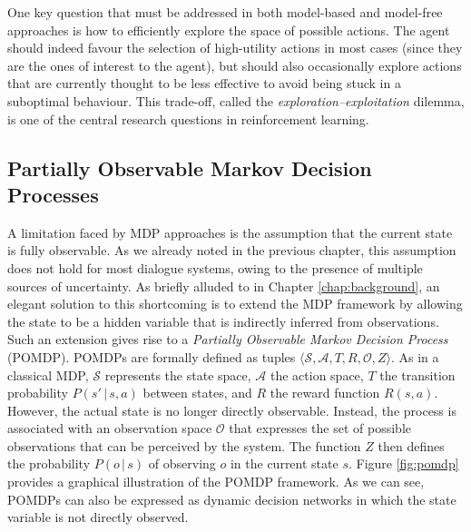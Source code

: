 One key question that must be addressed in both model-based and model-free approaches is how  to efficiently explore the space of possible actions.  The agent should indeed favour the selection of high-utility actions in most cases (since they are the ones of interest to the agent), but should also occasionally explore actions that are currently thought to be less effective to avoid being stuck in a suboptimal behaviour. This trade-off, called the \textit{exploration--exploitation} dilemma, is one of the central research questions in reinforcement learning. 


\subsection{Partially Observable Markov Decision Processes}
\label{sec:pomdp}

A limitation faced by MDP approaches is the assumption that the current state is fully observable. As we already noted in the previous chapter, this assumption does not hold for most dialogue systems, owing to the presence of multiple sources of uncertainty.  As briefly alluded to in Chapter \ref{chap:background}, an elegant solution to this shortcoming is to extend the MDP framework by allowing the state to be a hidden variable that is indirectly inferred from observations.  Such an extension gives rise to a  \textit{Partially Observable Markov Decision Process} (POMDP).  POMDPs are formally defined as tuples $\langle \mathcal{S}, \mathcal{A}, T, R, \mathcal{O}, Z \rangle$.  As in a classical MDP, $\mathcal{S}$ represents the state space, $\mathcal{A}$ the action space, $T$ the transition probability $P(s'\, | \, s,a)$ between states, and $R$ the reward function $R(s,a)$.  However, the actual state is no longer directly observable.  Instead, the process is associated with an observation space $\mathcal{O}$ that expresses the set of possible observations that can be perceived by the system. The function $Z$ then defines the probability $P(o\, |\, s)$ of observing $o$ in the current state $s$.  Figure \ref{fig:pomdp} provides a graphical illustration of the POMDP framework.  As we can see, POMDPs can also be expressed as dynamic decision networks in which the state variable is not directly observed. 

